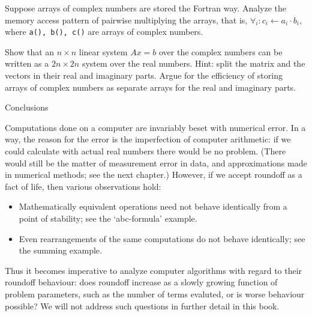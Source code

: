 \begin{exercise}
  Suppose arrays of complex numbers are stored the Fortran
  way. Analyze the memory access pattern of pairwise multiplying the
  arrays, that is, $\forall_i\colon c_i\leftarrow a_i\cdot b_i$, where
  \texttt{a(), b(), c()} are arrays of complex numbers.
\end{exercise}

\begin{exercise}
  Show that an $n\times n$ linear system $Ax=b$ over the complex numbers
  can be written as a $2n\times 2n$ system over the real
  numbers. Hint: split the matrix and the vectors in their real and
  imaginary parts. Argue for the efficiency of storing arrays of
  complex numbers as separate arrays for the real and imaginary parts.
\end{exercise}

 {Conclusions}

Computations done on a computer are invariably beset with numerical error.
In a way, the reason for the error is the imperfection of computer
arithmetic: if we could calculate with actual real numbers there would
be no problem. (There would still be the matter of measurement error
in data, and approximations made in numerical methods; see the next
chapter.) However, if we accept roundoff as a fact of life, then
various observations hold:
\begin{itemize}
\item Mathematically equivalent operations need not behave identically
  from a point of stability; see the `abc-formula' example.
\item Even rearrangements of the same computations do not behave
  identically; see the summing example.
\end{itemize}
Thus it
becomes imperative to analyze computer algorithms with regard to their
roundoff behaviour: does roundoff increase as a slowly growing
function of problem parameters, such as the number of terms evaluted,
or is worse behaviour possible? We will not address such questions in
further detail in this book.


